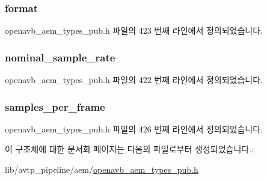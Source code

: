 \subsubsection[{\texorpdfstring{format}{format}}]{ format}\hypertarget{structopenavb__aem__stream__format__avtp__audio__t_a37f3210787a8b11a8f8811f7cf167fdf}{}\label{structopenavb__aem__stream__format__avtp__audio__t_a37f3210787a8b11a8f8811f7cf167fdf}


openavb\+\_\+aem\+\_\+types\+\_\+pub.\+h 파일의 423 번째 라인에서 정의되었습니다.

\subsubsection[{\texorpdfstring{nominal\+\_\+sample\+\_\+rate}{nominal_sample_rate}}]{ nominal\+\_\+sample\+\_\+rate}\hypertarget{structopenavb__aem__stream__format__avtp__audio__t_a0334ec8bb89451be357e518fac47c6e3}{}\label{structopenavb__aem__stream__format__avtp__audio__t_a0334ec8bb89451be357e518fac47c6e3}


openavb\+\_\+aem\+\_\+types\+\_\+pub.\+h 파일의 422 번째 라인에서 정의되었습니다.

\subsubsection[{\texorpdfstring{samples\+\_\+per\+\_\+frame}{samples_per_frame}}]{ samples\+\_\+per\+\_\+frame}\hypertarget{structopenavb__aem__stream__format__avtp__audio__t_ad1e55e1a786a746f7d7f18a3028c8432}{}\label{structopenavb__aem__stream__format__avtp__audio__t_ad1e55e1a786a746f7d7f18a3028c8432}


openavb\+\_\+aem\+\_\+types\+\_\+pub.\+h 파일의 426 번째 라인에서 정의되었습니다.



이 구조체에 대한 문서화 페이지는 다음의 파일로부터 생성되었습니다.\+:\begin{DoxyCompactItemize}
\item 
lib/avtp\+\_\+pipeline/aem/\hyperlink{openavb__aem__types__pub_8h}{openavb\+\_\+aem\+\_\+types\+\_\+pub.\+h}\end{DoxyCompactItemize}
